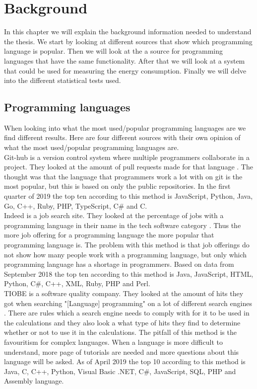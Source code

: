 \chapter{Background}
\label{ch:background}
In this chapter we will explain the background information needed to understand the thesis. We start by looking at different sources that show which programming language is popular. Then we will look at the a source for programming languages that have the same functionality. After that we will look at a system that could be used for measuring the energy consumption. Finally we will delve into the different statistical tests used. 

\section{Programming languages}
When looking into what the most used/popular programming languages are we find different results. Here are four different sources with their own opinion of what the most used/popular programming languages are.\\

Git-hub is a version control system where multiple programmers collaborate in a project. They looked at the amount of pull requests made for that language \cite{zap:2019}. The thought was that the language that programmers work a lot with on git is the most popular, but this is based on only the public repositories. In the first quarter of 2019 the top ten according to this method is JavaScript, Python, Java, Go, C++, Ruby, PHP, TypeScript, C\# and C. \\

Indeed is a job search site. They looked at the percentage of jobs with a programming language in their name in the tech software category \cite{ray:2018}. Thus the more job offering for a programming language the more popular that programming language is. The problem with this method is that job offerings do not show how many people work with a programming language, but only which programming language has a shortage in programmers. Based on data from September 2018 the top ten according to this method is Java, JavaScript, HTML, Python, C\#, C++, XML, Ruby, PHP and Perl.\\

TIOBE is a software quality company. They looked at the amount of hits they got when searching "[Language] programming" on a lot of different search engines \cite{tio:2019}. There are rules which a search engine needs to comply with for it to be used in the calculations and they also look a what type of hits they find to determine whether or not to use it in the calculations. The pitfall of this method is the favouritism for complex languages. When a language is more difficult to understand, more page of tutorials are needed and more questions about this language will be asked. As of April 2019 the top 10 according to this method is Java, C, C++, Python, Visual Basic .NET, C\#, JavaScript, SQL, PHP and Assembly language.\\

